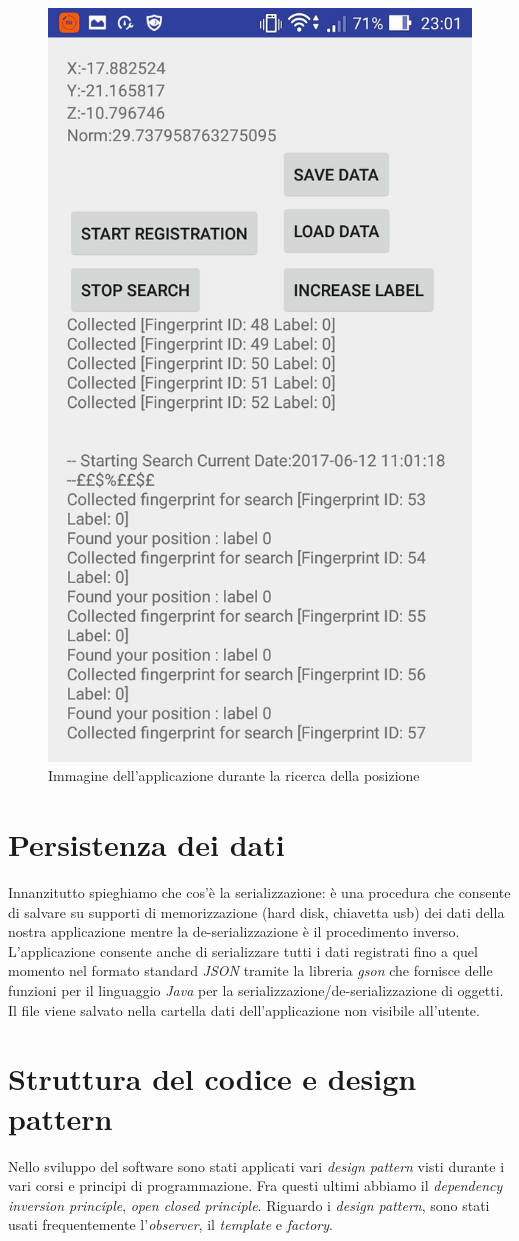 \begin{figure}
	\centering
	\includegraphics[width=0.4\linewidth]{img/app2}
	\caption{Immagine dell'applicazione durante la ricerca della posizione}
	\label{fig:app2}
\end{figure}


\section{Persistenza dei dati}
Innanzitutto spieghiamo che cos'\`e la serializzazione: \`e una procedura che consente di salvare su supporti di memorizzazione (hard disk, chiavetta usb) dei dati della nostra applicazione mentre la de-serializzazione \`e il procedimento inverso.
L'applicazione consente anche di serializzare tutti i dati registrati fino a quel momento nel formato standard \textit{JSON} tramite la libreria \textit{gson} che fornisce delle funzioni  per il linguaggio \textit{Java} per la serializzazione/de-serializzazione di oggetti. Il file viene salvato nella cartella dati dell'applicazione non visibile all'utente.

\section{Struttura del codice e design pattern}
Nello sviluppo del software sono stati applicati vari \textit{design pattern} visti durante i vari corsi e principi di programmazione. Fra questi ultimi abbiamo il \textit{dependency inversion principle}, \textit{open closed principle}. Riguardo i \textit{design pattern}, sono stati usati frequentemente l'\textit{observer}, il \textit{template} e \textit{factory}.

